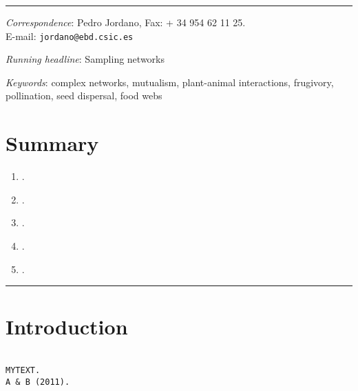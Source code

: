 
\def\mytitle{Sampling networks of ecological interactions}
\def\myauthor{Pedro Jordano      }
\def\latexaffiliation{Integrative Ecology Group, Estación Biológica de Doñana, Consejo Superior de Investigaciones Científicas (EBD-CSIC), Avenida Americo Vespucio s\slash n, E-41092 Sevilla, Spain}
\def\mydate{August 28, 2015}
\def\latexmode{memoir}
\def\email{jordano@ebd.csic.es}
\def\format{complete}
\def\latexxslt{xhtml2latex.xslt}
\def\bibliocommand{}
\def\bibliographytitle{Bibliography}
\def\bibliostyle{bes}


\begin{center}\rule{3in}{0.4pt}

\emph{Correspondence}: Pedro Jordano, Fax: + 34 954 62 11 25.\\
E-mail: \texttt{jordano@ebd.csic.es} 

\emph{Running headline}: Sampling networks

\emph{Keywords}: complex networks, mutualism, plant-animal interactions, frugivory, pollination, seed dispersal, food webs
\end{center}
\newpage



\section{Summary}
\label{summary}

\begin{enumerate}
\item .

\item .

\item .

\item .

\item .

\end{enumerate}

\begin{center}\rule{3in}{0.4pt}\end{center}


\section{Introduction}
\label{introduction}

\begin{adjustwidth}{2.5em}{2.5em}
\begin{verbatim}

MYTEXT.   
A & B (2011).   

\end{verbatim}
\end{adjustwidth}


